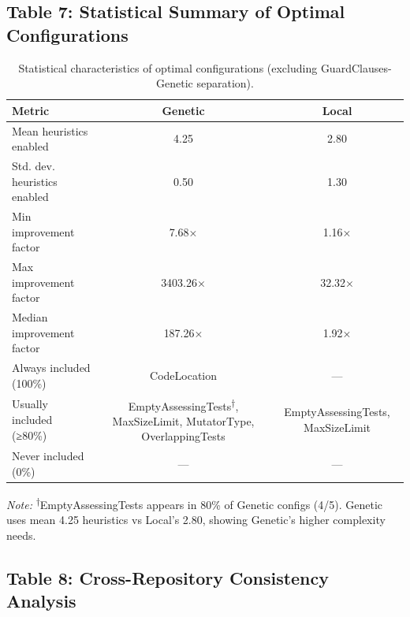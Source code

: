 \documentclass{article}
\begin{document}

\subsection*{Table 7: Statistical Summary of Optimal Configurations}

\begin{table}[h]
\centering
\caption{Statistical characteristics of optimal configurations (excluding GuardClauses-Genetic separation).}
\label{tab:stats}
\begin{tabular}{@{}lcc@{}}
\toprule
\textbf{Metric} & \textbf{Genetic} & \textbf{Local} \\
\midrule
Mean heuristics enabled           & 4.25 & 2.80 \\
Std. dev. heuristics enabled      & 0.50 & 1.30 \\
Min improvement factor            & 7.68× & 1.16× \\
Max improvement factor            & 3403.26× & 32.32× \\
Median improvement factor         & 187.26× & 1.92× \\
Always included (100\%)           & CodeLocation & --- \\
Usually included (≥80\%)          & EmptyAssessingTests\textsuperscript{†}, MaxSizeLimit, MutatorType, OverlappingTests & EmptyAssessingTests, MaxSizeLimit \\
Never included (0\%)              & --- & --- \\
\bottomrule
\end{tabular}
\end{table}

\textit{Note:} \textsuperscript{†}EmptyAssessingTests appears in 80\% of Genetic configs (4/5). Genetic uses mean 4.25 heuristics vs Local's 2.80, showing Genetic's higher complexity needs.


\subsection*{Table 8: Cross-Repository Consistency Analysis}
\end{document}
